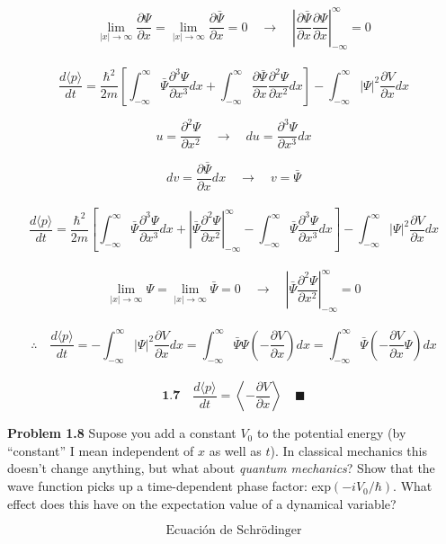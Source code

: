 \documentclass[10pt,a4papper]{article}
\begin{document}
\[\lim_{|x|\to\infty}\frac{\partial\Psi}{\partial x}=\lim_{|x|\to\infty}\frac{\partial\bar\Psi}{\partial x}=0\quad\to\quad
\left|\frac{\partial\bar\Psi}{\partial x}\frac{\partial\Psi}{\partial x}\right|_{-\infty}^\infty=0\]\\

\[\frac{d\langle p\rangle}{dt}=
\frac{\hbar^2}{2m}\left[
  \int_{-\infty}^\infty\bar\Psi\frac{\partial^3\Psi}{\partial x^3}dx
  +\int_{-\infty}^\infty\frac{\partial\bar\Psi}{\partial x}\frac{\partial^2\Psi}{\partial x^2}dx\right]
-\int_{-\infty}^\infty|\Psi|^2\frac{\partial V}{\partial x}dx\]

\newpage
\[u=\frac{\partial^2\Psi}{\partial x^2}\quad\to\quad du=\frac{\partial^3\Psi}{\partial x^3}dx\]

\[dv=\frac{\partial\bar\Psi}{\partial x}dx\quad\to\quad v=\bar\Psi\]\\

\[\frac{d\langle p\rangle}{dt}=
\frac{\hbar^2}{2m}\left[
  \int_{-\infty}^\infty\bar\Psi\frac{\partial^3\Psi}{\partial x^3}dx
  +\left|\bar\Psi\frac{\partial^2\Psi}{\partial x^2}\right|_{-\infty}^\infty
  -\int_{-\infty}^\infty\bar\Psi\frac{\partial^3\Psi}{\partial x^3}dx\right]
-\int_{-\infty}^\infty|\Psi|^2\frac{\partial V}{\partial x}dx\]\\

\[\lim_{|x|\to\infty}\Psi=\lim_{|x|\to\infty}\bar\Psi=0\quad\to\quad
\left|\bar\Psi\frac{\partial^2\Psi}{\partial x^2}\right|_{-\infty}^\infty=0\]\\

\[\therefore\quad\frac{d\langle p\rangle}{dt}=
-\int_{-\infty}^\infty|\Psi|^2\frac{\partial V}{\partial x}dx=
\int_{-\infty}^\infty\bar\Psi\Psi\left(-\frac{\partial V}{\partial x}\right)dx=
\int_{-\infty}^\infty\bar\Psi\left(-\frac{\partial V}{\partial x}\Psi\right)dx\]\\

\[\boxed{\textbf{1.7}\quad\frac{d\langle p\rangle}{dt}=\left\langle-\frac{\partial V}{\partial x}\right\rangle\quad\blacksquare}\]

\newpage
\textbf{Problem 1.8} Supose you add a constant $V_0$ to the potential energy (by
``constant'' I mean independent of $x$ as well as $t$). In classical mechanics this
doesn't change anything, but what about \emph{quantum mechanics}? Show that
the wave function picks up a time-dependent phase factor: exp$(-iV_0/\hbar)$. What
effect does this have on the expectation value of a dynamical variable?

\newpage
\[\text{Ecuación de Schrödinger}\]
\end{document}
